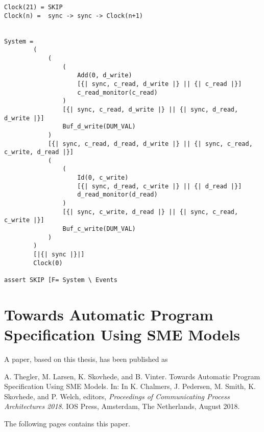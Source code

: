 \begin{verbatim}
Clock(21) = SKIP
Clock(n) =  sync -> sync -> Clock(n+1)


System =
        (
            (
                (
                    Add(0, d_write)
                    [{| sync, c_read, d_write |} || {| c_read |}]
                    c_read_monitor(c_read)
                )
                [{| sync, c_read, d_write |} || {| sync, d_read, d_write |}]
                Buf_d_write(DUM_VAL)
            )
            [{| sync, c_read, d_read, d_write |} || {| sync, c_read, c_write, d_read |}]
            (
                (
                    Id(0, c_write)
                    [{| sync, d_read, c_write |} || {| d_read |}]
                    d_read_monitor(d_read)
                )
                [{| sync, c_write, d_read |} || {| sync, c_read, c_write |}]
                Buf_c_write(DUM_VAL)
            )
        )
        [|{| sync |}|]
        Clock(0)

assert SKIP [F= System \ Events
\end{verbatim}


\chapter{Towards Automatic Program Specification
Using SME Models}
\label{app:paper}
\noindent A paper, based on this thesis, has been published as

\begin{center}
\begin{minipage}{0.8\textwidth}
    A. Thegler, M. Larsen, K. Skovhede, and B. Vinter. Towards Automatic Program Specification Using SME Models. In: In K. Chalmers, J. Pedersen, M. Smith, K. Skovhede, and P. Welch,
    editors, {\itshape Proceedings of Communicating Process Architectures
    2018}. IOS Press, Amsterdam, The Netherlands,
    August 2018.
\end{minipage}
\end{center}
The following pages contains this paper.
